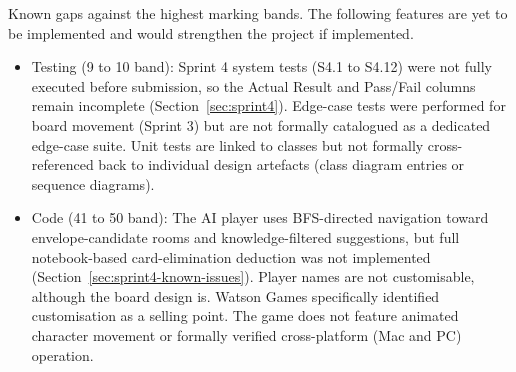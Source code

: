 \vspace{1em}

Known gaps against the highest marking bands. The following features are yet to be implemented and would strengthen the project if implemented.

\begin{itemize}
    \item Testing (9 to 10 band): Sprint 4 system tests (S4.1 to S4.12) were not fully executed before submission, so the Actual Result and Pass/Fail columns remain incomplete (Section~\ref{sec:sprint4}). Edge-case tests were performed for board movement (Sprint 3) but are not formally catalogued as a dedicated edge-case suite. Unit tests are linked to classes but not formally cross-referenced back to individual design artefacts (class diagram entries or sequence diagrams).
    \item Code (41 to 50 band): The AI player uses BFS-directed navigation toward envelope-candidate rooms and knowledge-filtered suggestions, but full notebook-based card-elimination deduction was not implemented (Section~\ref{sec:sprint4-known-issues}). Player names are not customisable, although the board design is. Watson Games specifically identified customisation as a selling point. The game does not feature animated character movement or formally verified cross-platform (Mac and PC) operation.
\end{itemize}

\newpage
